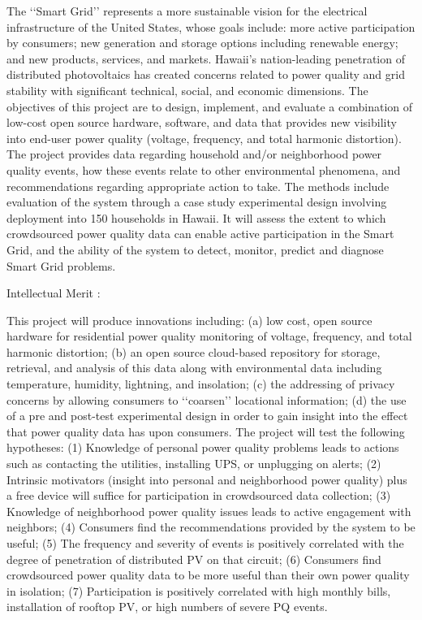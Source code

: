 The ‘‘Smart Grid’’ represents a more sustainable vision for the electrical infrastructure
of the United States, whose goals include: more active participation by consumers; new generation
and storage options including renewable energy; and new products, services, and markets.
Hawaii’s nation-leading penetration of distributed photovoltaics has created concerns related
to power quality and grid stability with significant technical, social, and economic dimensions.
The objectives of this project are to design, implement, and evaluate a combination of low-cost
open source hardware, software, and data that provides new visibility into end-user power
quality (voltage, frequency, and total harmonic distortion). The project provides data regarding
household and/or neighborhood power quality events, how these events relate to other environmental
phenomena, and recommendations regarding appropriate action to take.
The methods include evaluation of the system through a case study experimental design involving
deployment into 150 households in Hawaii. It will assess the extent to which crowdsourced
power quality data can enable active participation in the Smart Grid, and the ability of the
system to detect, monitor, predict and diagnose Smart Grid problems.

Intellectual Merit :

This project will produce innovations including: (a) low cost, open source hardware for residential
power quality monitoring of voltage, frequency, and total harmonic distortion; (b) an open
source cloud-based repository for storage, retrieval, and analysis of this data along with
environmental data including temperature, humidity, lightning, and insolation; (c) the addressing
of privacy concerns by allowing consumers to ‘‘coarsen’’ locational information; (d) the use
of a pre and post-test experimental design in order to gain insight into the effect that power
quality data has upon consumers.
The project will test the following hypotheses: (1) Knowledge of personal power quality problems
leads to actions such as contacting the utilities, installing UPS, or unplugging on alerts;
(2) Intrinsic motivators (insight into personal and neighborhood power quality) plus a free
device will suffice for participation in crowdsourced data collection; (3) Knowledge of neighborhood
power quality issues leads to active engagement with neighbors; (4) Consumers find the recommendations
provided by the system to be useful; (5) The frequency and severity of events is positively
correlated with the degree of penetration of distributed PV on that circuit; (6) Consumers
find crowdsourced power quality data to be more useful than their own power quality in isolation;
(7) Participation is positively correlated with high monthly bills, installation of rooftop
PV, or high numbers of severe PQ events.

